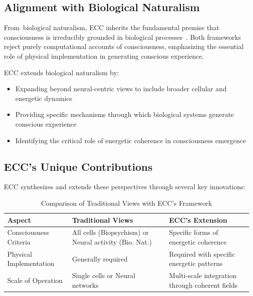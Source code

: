 \subsection*{Alignment with Biological Naturalism}

From~biological naturalism, ECC inherits the fundamental premise that consciousness is irreducibly grounded in biological processes~\cite{searle2017biological,searle1992rediscovery}. Both frameworks reject purely computational accounts of consciousness, emphasizing the essential role of physical implementation in generating conscious experience.

ECC extends biological naturalism by:
\begin{itemize}
    \item Expanding beyond neural-centric views to include broader cellular and energetic dynamics
    \item Providing specific mechanisms through which biological systems generate conscious experience
    \item Identifying the critical role of energetic coherence in consciousness emergence
\end{itemize}

\subsection*{ECC's Unique Contributions}

ECC synthesizes and extends these perspectives through several key innovations:

\begin{table}[h]
    \centering
    \begin{tabular}{|p{}|p{}|p{}|}
        \hline
        \textbf{Aspect}         & \textbf{Traditional Views}                             & \textbf{ECC's Extension}                        \\
        \hline
        Consciousness Criteria  & All cells (Biopsychism) or Neural activity (Bio. Nat.) & Specific forms of energetic coherence           \\
        \hline
        Physical Implementation & Generally required                                     & Required with specific energetic patterns       \\
        \hline
        Scale of Operation      & Single cells or Neural networks                        & Multi-scale integration through coherent fields \\
        \hline
    \end{tabular}
    \caption{Comparison of Traditional Views with ECC's Framework}
    \label{tab:framework_comparison}
\end{table}

